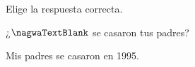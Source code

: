 
\begin{question}

\begin{instance}
  
\begin{mcq}[standalone=false]
    
\begin{stem}
      Elige la respuesta correcta.\par  
\begin{enumerationnolabel}
  \item{¿$\nagwaTextBlank$ se casaron tus padres?}  
  \item{Mis padres se casaron en 1995.}
\end{enumerationnolabel}
          
\end{stem}
    
\begin{distractors}
\end{distractors}
              
\end{mcq}

\end{instance}

\end{question}
